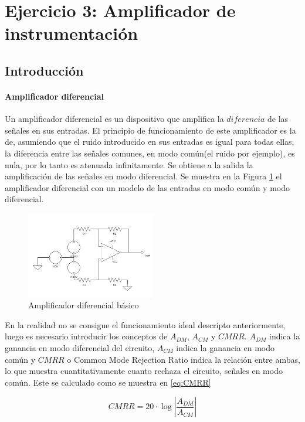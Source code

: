 \section{Ejercicio 3: Amplificador de instrumentaci\'on} 
\subsection{Introducci\'on}
\paragraph{Amplificador diferencial}
Un amplificador diferencial es un dispositivo que amplifica la $\textit{diferencia}$ de las se\~nales en sus entradas. El principio de funcionamiento de este amplificador es la de, asumiendo que el ruido introducido en sus entradas es igual para todas ellas,  la diferencia entre las se\~nales comunes, en modo com\'un(el ruido por ejemplo), es nula, por lo tanto es atenuada infinitamente. Se obtiene a la salida la amplificaci\'on de las se\~nales en modo diferencial.
Se muestra en la Figura \ref{fig:AMP_DIF}  el amplificador diferencial con un modelo de las entradas en modo com\'un y modo diferencial.
\begin{figure}[H]

    \centering
    \includegraphics[width=0.5\textwidth]{../EJ3/Recursos/AMP_DIF}
    \caption{Amplificador diferencial b\'asico}
    \label{fig:AMP_DIF}
\end{figure}

En la realidad no se consigue el funcionamiento ideal descripto anteriormente, luego es necesario introducir los conceptos de $A_{DM}$, $A_{CM}$ y $CMRR$. $A_{DM}$ indica la ganancia en modo diferencial del circuito, $A_{CM}$ indica la ganancia en modo com\'un y $CMRR$ o Common Mode Rejection Ratio indica la relaci\'on entre ambas, lo que muestra cuantitativamente cuanto rechaza el circuito, se\~nales en modo com\'un. Este se calculado como se muestra en \ref{eq:CMRR}

 \begin{equation}
    CMRR=20 \cdot \log \left| \frac{A_{DM}}{A_{CM}} \right|
    \label{eq:CMRR}
 \end{equation}

